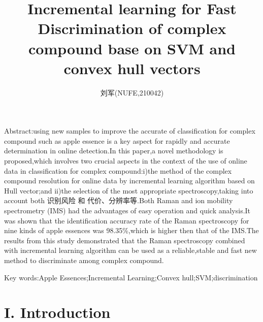 \documentclass[a4paper]{article}
\author{刘军(NUFE,210042)}
\date{}
\title{Incremental learning for Fast Discrimination of complex compound base on SVM and convex hull vectors }
\begin{document}
\maketitle


Abstract:using new samples to improve the accurate of classification for complex compound such as apple essence is a key aspect for rapidly and accurate determination in online detection.In this paper,a novel methodology is proposed,which involves two crucial aspects in the context of the use of online data in classification for complex compound:i)the method of the complex compound resolution for online data by incremental learning algorithm based on Hull vector;and ii)the selection of the most appropriate spectroscopy,taking into account both 识别风险 和 代价、分辨率等.Both Raman and ion mobility spectrometry (IMS) had the advantages of easy operation and  quick  analysis.It was shown that the identification accuracy rate of the Raman spectroscopy for nine kinds of apple essences was 98.35\%,which is higher then that of the IMS.The results from this study demonstrated that the Raman spectroscopy combined with incremental learning algorithm can be used as a reliable,stable and fast new method to discriminate among complex compound.

Key words:Apple Essences;Incremental Learning;Convex hull;SVM;discrimination
\section{I. Introduction}
\end{document}
